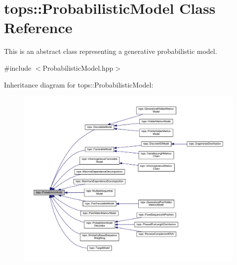 \hypertarget{classtops_1_1ProbabilisticModel}{}\section{tops\+:\+:Probabilistic\+Model Class Reference}
\label{classtops_1_1ProbabilisticModel}


This is an abstract class representing a generative probabilistic model.  




{\ttfamily \#include $<$Probabilistic\+Model.\+hpp$>$}



Inheritance diagram for tops\+:\+:Probabilistic\+Model\+:
\nopagebreak
\begin{figure}[H]
\begin{center}
\leavevmode
\includegraphics[width=350pt]{classtops_1_1ProbabilisticModel__inherit__graph}
\end{center}
\end{figure}
